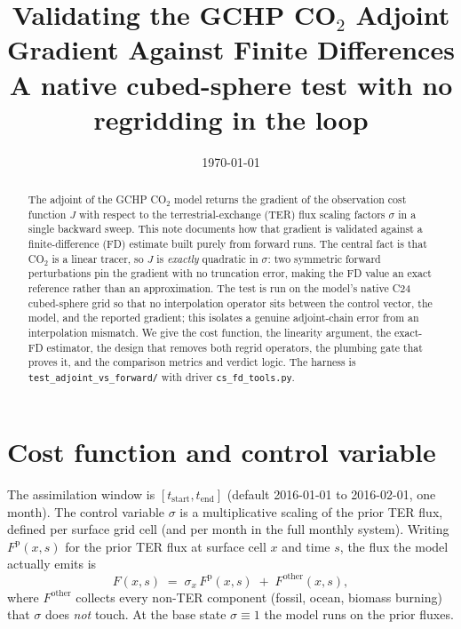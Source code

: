 \documentclass[12pt]{article}
\title{\textbf{Validating the GCHP CO$_2$ Adjoint Gradient
Against Finite Differences}\\
\large A native cubed-sphere test with no regridding in the loop}
\author{}
\date{\today}
\newcommand{\Fprior}{F^{\mathrm{p}}}
\newcommand{\tend}{t_{\mathrm{end}}}
\newcommand{\tstart}{t_{\mathrm{start}}}
\begin{document}
\maketitle

\begin{abstract}
The adjoint of the GCHP CO$_2$ model returns the gradient of the observation
cost function $J$ with respect to the terrestrial-exchange (TER) flux scaling
factors $\sigma$ in a single backward sweep. This note documents how that
gradient is validated against a finite-difference (FD) estimate built purely
from forward runs. The central fact is that CO$_2$ is a linear tracer, so $J$ is
\emph{exactly} quadratic in $\sigma$: two symmetric forward perturbations pin the
gradient with no truncation error, making the FD value an exact reference rather
than an approximation. The test is run on the model's native C24 cubed-sphere
grid so that no interpolation operator sits between the control vector, the model,
and the reported gradient; this isolates a genuine adjoint-chain error from an
interpolation mismatch. We give the cost function, the linearity argument, the
exact-FD estimator, the design that removes both regrid operators, the plumbing
gate that proves it, and the comparison metrics and verdict logic. The harness is
\texttt{test\_adjoint\_vs\_forward/} with driver \texttt{cs\_fd\_tools.py}.
\end{abstract}

\section{Cost function and control variable}

The assimilation window is $[\tstart,\tend]$ (default 2016-01-01 to 2016-02-01,
one month). The control variable $\sigma$ is a multiplicative scaling of the
prior TER flux, defined per surface grid cell (and per month in the full monthly
system). Writing $\Fprior(x,s)$ for the prior TER flux at surface cell $x$ and
time $s$, the flux the model actually emits is
%
\begin{equation}
  F(x,s) \;=\; \sigma_{x}\,\Fprior(x,s) \;+\; F^{\mathrm{other}}(x,s),
  \label{eq:flux}
\end{equation}
%
where $F^{\mathrm{other}}$ collects every non-TER component (fossil, ocean,
biomass burning) that $\sigma$ does \emph{not} touch. At the base state
$\sigma \equiv 1$ the model runs on the prior fluxes.
\end{document}

